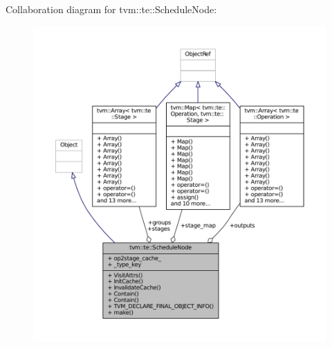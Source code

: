 Collaboration diagram for tvm\+:\+:te\+:\+:Schedule\+Node\+:
\nopagebreak
\begin{figure}[H]
\begin{center}
\leavevmode
\includegraphics[width=350pt]{classtvm_1_1te_1_1ScheduleNode__coll__graph}
\end{center}
\end{figure}
